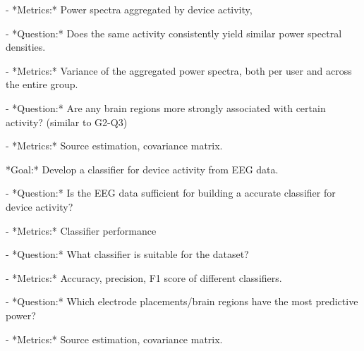 \documentclass{IEEEtran}
\begin{document}
\begin{refsection}
\begin{markdown}
    - *Metrics:* Power spectra aggregated by device activity,

 - *Question:* Does the same activity consistently yield similar power spectral densities.

    - *Metrics:* Variance of the aggregated power spectra, both per user and across the entire group.

 - *Question:* Are any brain regions more strongly associated with certain activity? (similar to G2-Q3)

    - *Metrics:* Source estimation, covariance matrix.
\end{markdown}


\begin{markdown}
*Goal:* Develop a classifier for device activity from EEG data.

 - *Question:* Is the EEG data sufficient for building a accurate classifier for device activity?

    - *Metrics:* Classifier performance

 - *Question:* What classifier is suitable for the dataset?

    - *Metrics:* Accuracy, precision, F1 score of different classifiers.

 - *Question:* Which electrode placements/brain regions have the most predictive power?

    - *Metrics:* Source estimation, covariance matrix.
\end{markdown}

%
%
%





\end{refsection}
\end{document}
